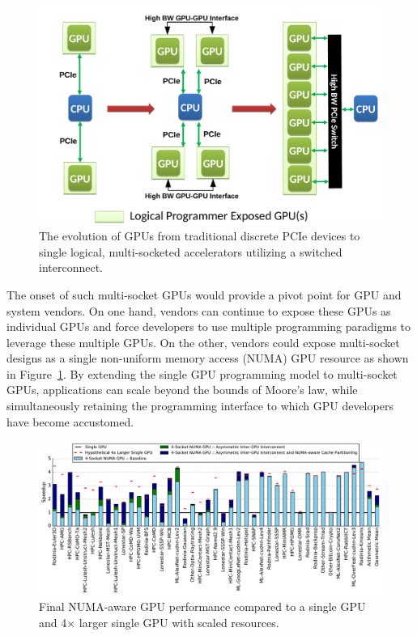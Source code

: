 \documentclass{sig-alternate}
\begin{document}
\begin{figure}[t]
	\centering
	\includegraphics[width=1.0\columnwidth]{figures/inter_gpu_connections.pdf}
	\caption{The evolution of GPUs from traditional discrete PCIe devices to 
		single logical, multi-socketed accelerators utilizing a switched interconnect.}
	\vspace{-0.5cm}
	\label{fig:systemdiagram}
\end{figure}

The onset of such multi-socket GPUs would provide a pivot point for GPU and system vendors. On one hand, vendors can continue to expose these GPUs as 
individual GPUs and force developers to use multiple programming paradigms to 
leverage these multiple GPUs. On the other, vendors could expose multi-socket 
designs as a single non-uniform memory access (NUMA) GPU resource as shown in Figure~\ref{fig:systemdiagram}.  
By extending the single GPU programming model to multi-socket GPUs,  applications 
can scale beyond the bounds of Moore's law, while simultaneously retaining the 
programming interface to which GPU developers have become accustomed.

\begin{figure}[!t]
	\centering
	\includegraphics[width=1.0\textwidth]{figures/plot_final_speedup_WB_nvlink_first.pdf}
	\caption{Final NUMA-aware GPU performance compared to a single GPU and 4$\times$ larger single GPU with scaled resources.}
	\label{fig:combined}
\end{figure}
\end{document}
